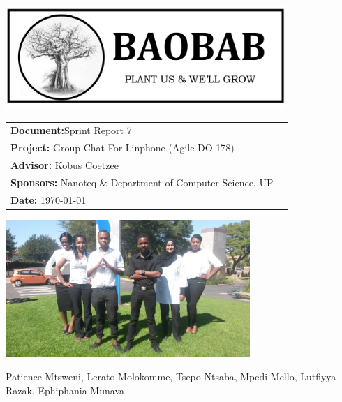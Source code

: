 \begin{titlepage}

\begin{center}

\includegraphics[width=400px]{pictures/logo.jpg}
\vspace{0.5 cm}
\begin{flushright} \large
\begin{tabular}{lr}
\vspace{1 cm}
\LARGE\textbf{Document:}Sprint Report 7\\

\vspace{1 cm}
\LARGE\textbf{Project:} Group Chat For Linphone (Agile DO-178)\\
\vspace{1 cm}
\LARGE\textbf{Advisor:} Kobus Coetzee\\
\vspace{1 cm}
\LARGE\textbf{Sponsors:} Nanoteq \& Department of Computer Science, UP\\
\vspace{1 cm}
\LARGE\textbf{Date: }\today\\
\end{tabular}
\end{flushright}

\centering \includegraphics[width=350px]{pictures/Team.jpg}

Patience Mtsweni, Lerato Molokomme, Tsepo Ntsaba, Mpedi Mello, Lutfiyya Razak, Ephiphania Munava\\


\end{center}
\end{titlepage}